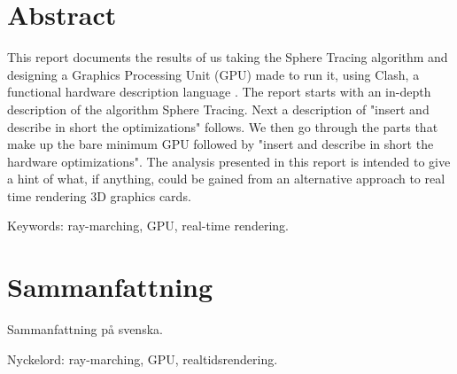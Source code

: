 \thispagestyle{plain}			%
\setlength{\parskip}{0pt plus 1.0pt}
\section*{Abstract}

	This report documents the results of us taking the Sphere Tracing algorithm
	and designing a Graphics Processing Unit (GPU) made to run it, using Clash, 
	a functional hardware description language .\cite{Raa2015a} The report 
	starts with an in-depth description of the algorithm Sphere Tracing. 
	Next a description of "insert and describe in short	the optimizations" 
	follows. We then go through the parts that make up the 
	bare minimum GPU followed by "insert and describe in short the hardware 
	optimizations". The analysis presented in this report is intended to give 
	a hint of what,	if anything, could be gained from an alternative approach 
	to real time rendering 3D graphics cards.

	\vfill
	Keywords: ray-marching, GPU, real-time rendering.

\newpage
\thispagestyle{plain}

\section*{Sammanfattning}
	
	Sammanfattning på svenska.
	
	\vfill
	Nyckelord: ray-marching, GPU, realtidsrendering.


\newpage
\thispagestyle{empty}
\mbox{}

